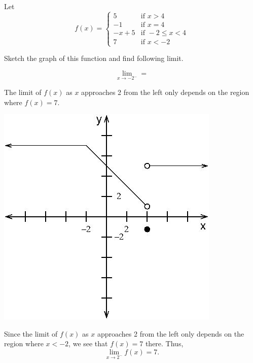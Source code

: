 \documentclass{ximera}
\author{Emma Smith Zbarsky}
\begin{document}
\begin{exercise}

Let
\[f(x) = \begin{cases} 5 & \mbox{if } x>4 \\ -1 & \mbox{if } x=4 \\ -x+5 & \mbox{if } -2\leq x < 4 \\ 7 & \mbox{if } x<-2 \end{cases}\]

Sketch the graph of this function and find following limit.

\[\lim_{x \to -2^-} = \]


\begin{hint}
The limit of $f(x)$ as $x$ approaches 2 from the left only depends on
the region where $f(x) = 7$.
\end{hint}


\begin{hint}
\begin{image}\includegraphics[width=.5\textwidth]{piecewise.jpg}\end{image}

 Since the limit of $f(x)$ as $x$ approaches 2 from
the left only depends on the region where $x<-2$, we see that $f(x) = 7$
there. Thus, \[\lim_{x\to 2^-}f(x) = 7.\]
\end{hint}


\begin{multipleChoice}
\end{multipleChoice}

\end{exercise}
\end{document}
